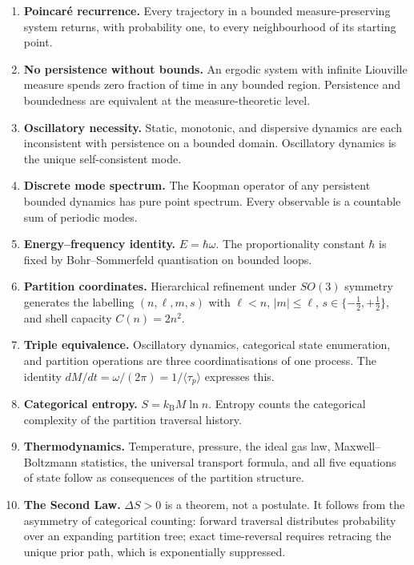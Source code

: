 \begin{enumerate}[label=(\roman*),leftmargin=2em,itemsep=2pt]
  \item \textbf{Poincaré recurrence.} Every trajectory in a bounded measure-preserving system returns, with probability one, to every neighbourhood of its starting point.
  \item \textbf{No persistence without bounds.} An ergodic system with infinite Liouville measure spends zero fraction of time in any bounded region. Persistence and boundedness are equivalent at the measure-theoretic level.
  \item \textbf{Oscillatory necessity.} Static, monotonic, and dispersive dynamics are each inconsistent with persistence on a bounded domain. Oscillatory dynamics is the unique self-consistent mode.
  \item \textbf{Discrete mode spectrum.} The Koopman operator of any persistent bounded dynamics has pure point spectrum. Every observable is a countable sum of periodic modes.
  \item \textbf{Energy--frequency identity.} $E = \hbar\omega$. The proportionality constant $\hbar$ is fixed by Bohr--Sommerfeld quantisation on bounded loops.
  \item \textbf{Partition coordinates.} Hierarchical refinement under $SO(3)$ symmetry generates the labelling $(n,\ell,m,s)$ with $\ell < n$, $|m| \leq \ell$, $s \in \{-\tfrac{1}{2}, +\tfrac{1}{2}\}$, and shell capacity $C(n) = 2n^{2}$.
  \item \textbf{Triple equivalence.} Oscillatory dynamics, categorical state enumeration, and partition operations are three coordinatisations of one process. The identity $dM/dt = \omega/(2\pi) = 1/\langle\tau_p\rangle$ expresses this.
  \item \textbf{Categorical entropy.} $S = k_{\mathrm{B}} M \ln n$. Entropy counts the categorical complexity of the partition traversal history.
  \item \textbf{Thermodynamics.} Temperature, pressure, the ideal gas law, Maxwell--Boltzmann statistics, the universal transport formula, and all five equations of state follow as consequences of the partition structure.
  \item \textbf{The Second Law.} $\Delta S > 0$ is a theorem, not a postulate. It follows from the asymmetry of categorical counting: forward traversal distributes probability over an expanding partition tree; exact time-reversal requires retracing the unique prior path, which is exponentially suppressed.
\end{enumerate}

